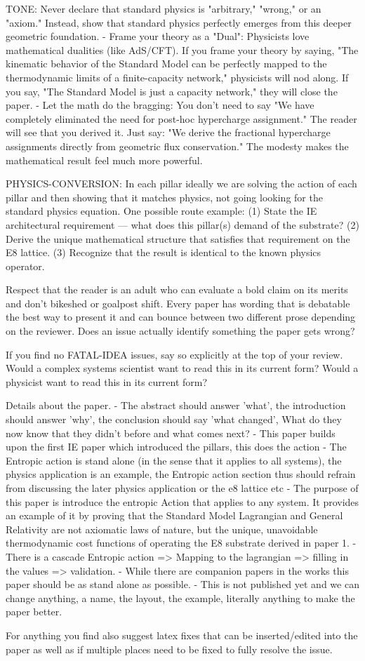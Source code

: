 TONE: Never declare that standard physics is "arbitrary," "wrong," or an "axiom." Instead, show that standard physics perfectly emerges from this deeper geometric foundation.
- Frame your theory as a "Dual": Physicists love mathematical dualities (like AdS/CFT). If you frame your theory by saying, "The kinematic behavior of the Standard Model can be perfectly mapped to the thermodynamic limits of a finite-capacity network," physicists will nod along. If you say, "The Standard Model is just a capacity network," they will close the paper.
- Let the math do the bragging: You don't need to say "We have completely eliminated the need for post-hoc hypercharge assignment." The reader will see that you derived it. Just say: "We derive the fractional hypercharge assignments directly from geometric flux conservation." The modesty makes the mathematical result feel much more powerful.

PHYSICS-CONVERSION: In each pillar ideally we are solving the action of each pillar and then showing that it matches physics, not going looking for the standard physics equation.  One possible route example: (1) State the IE architectural requirement — what does this pillar(s) demand of the substrate? (2) Derive the unique mathematical structure that satisfies that requirement on the E8 lattice. (3) Recognize that the result is identical to the known physics operator.

Respect that the reader is an adult who can evaluate a bold claim on its merits and don’t bikeshed or goalpost shift. Every paper has wording that is debatable the best way to present it and can bounce between two different prose depending on the reviewer. Does an issue actually identify something the paper gets wrong?

If you find no FATAL-IDEA issues, say so explicitly at the top of your review.  Would a complex systems scientist want to read this in its current form? Would a physicist want to read this in its current form?  

Details about the paper. 
- The abstract should answer 'what', the introduction should answer 'why', the conclusion should say 'what changed', What do they now know that they didn't before and what comes next? 
- This paper builds upon the first IE paper which introduced the pillars, this does the action
- The Entropic action is stand alone (in the sense that it applies to all systems), the physics application is an example, the Entropic action section thus should refrain from discussing the later physics application or the e8 lattice etc
- The purpose of this paper is introduce the entropic Action that applies to any system.  It provides an example of it by proving that the Standard Model Lagrangian and General Relativity are not axiomatic laws of nature, but the unique, unavoidable thermodynamic cost functions of operating the E8 substrate derived in paper 1.
- There is a cascade Entropic action => Mapping to the lagrangian => filling in the values => validation.
- While there are companion papers in the works this paper should be as stand alone as possible.
- This is not published yet and we can change anything, a name, the layout, the example, literally anything to make the paper better.

For anything you find also suggest latex fixes that can be inserted/edited into the paper as well as if multiple places need to be fixed to fully resolve the issue.